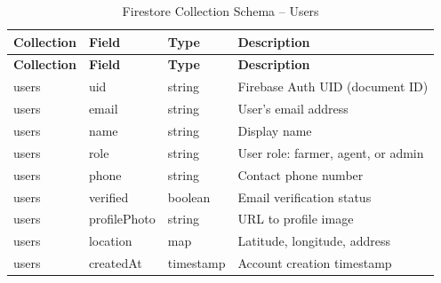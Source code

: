 \documentclass[a4paper,12pt,oneside]{report}
\begin{document}
\begin{longtable}{|p{2.5cm}|p{3cm}|p{2cm}|p{5cm}|}
\caption{Firestore Collection Schema -- Users} \label{tab:schema-users} \\
\hline
\textbf{Collection} & \textbf{Field} & \textbf{Type} & \textbf{Description} \\
\hline
\endfirsthead
\hline
\textbf{Collection} & \textbf{Field} & \textbf{Type} & \textbf{Description} \\
\hline
\endhead
users & uid & string & Firebase Auth UID (document ID) \\
\hline
users & email & string & User's email address \\
\hline
users & name & string & Display name \\
\hline
users & role & string & User role: farmer, agent, or admin \\
\hline
users & phone & string & Contact phone number \\
\hline
users & verified & boolean & Email verification status \\
\hline
users & profilePhoto & string & URL to profile image \\
\hline
users & location & map & Latitude, longitude, address \\
\hline
users & createdAt & timestamp & Account creation timestamp \\
\hline
\end{longtable}
\end{document}
